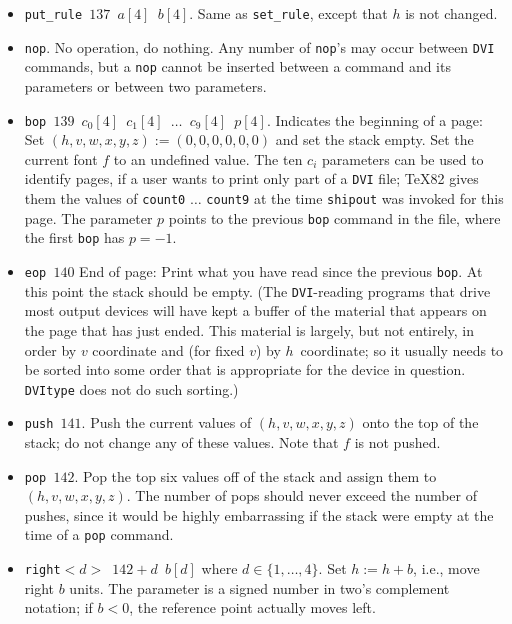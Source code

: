 \documentclass[10pt, a4paper, english]{article}
\begin{document}
\begin{itemize}
\item[137] \texttt{put\_rule $137$ $a[4]$ $b[4]$}. 
Same as \texttt{set\_rule}, except that $h$ is not changed. 

\item[138] \texttt{nop}. 
No operation, do nothing. Any number of \texttt{nop}'s
may occur between \texttt{DVI} commands, 
but a \texttt{nop} cannot be inserted 
between a command and its parameters or between two parameters. 

\item[139] \texttt{bop $139$ $c_0[4]$ $c_1[4]$ $\ldots$ $c_9[4]$ $p[4]$}. 
Indicates the beginning of a page: 
Set $(h,v,w,x,y,z):=(0,0,0,0,0,0)$ and set the stack empty. 
Set the current font $f$ to an undefined value.  
The ten $c_i$ parameters can be used to identify pages, 
if a user wants to print only part of a \texttt{DVI} file; 
\TeX82 gives them the values of \texttt{count0} $\ldots$ \texttt{count9} 
at the time \texttt{shipout} was invoked for this page.  
The parameter $p$ points to the previous \texttt{bop} command in the file, 
where the first \texttt{bop} has $p=-1$.

\item[140] \texttt{eop $140$} 
End of page: 
Print what you have read since the previous \texttt{bop}. 
At this point the stack should be empty. 
(The \texttt{DVI}-reading programs that drive most output devices 
will have kept a buffer of the material 
that appears on the page that has just ended. 
This material is largely, but not entirely, 
in order by $v$ coordinate and (for fixed $v$) by $h$~coordinate; 
so it usually needs to be sorted into some order that is
appropriate for the device in question. 
\texttt{DVItype} does not do such sorting.)


\item[141] \texttt{push $141$}. 
Push the current values of $(h,v,w,x,y,z)$ onto the top of the stack; 
do not change any of these values. Note that $f$ is not pushed. 


\item[142] \texttt{pop $142$}. 
Pop the top six values off of the stack and assign them to $(h,v,w,x,y,z)$. 
The number of pops should never exceed the number of pushes, 
since it would be highly embarrassing if the stack were empty 
at the time of a \texttt{pop} command.

\item[143--146] \texttt{right$<d>$ $142+d$ $b[d]$} where $d\in\{1,\dots,4\}$. 
Set $h:=h+b$, i.e., move right $b$ units.
The parameter is a signed number in two's complement notation; 
if $b<0$, the reference point actually moves left.


\end{itemize}
\end{document}
